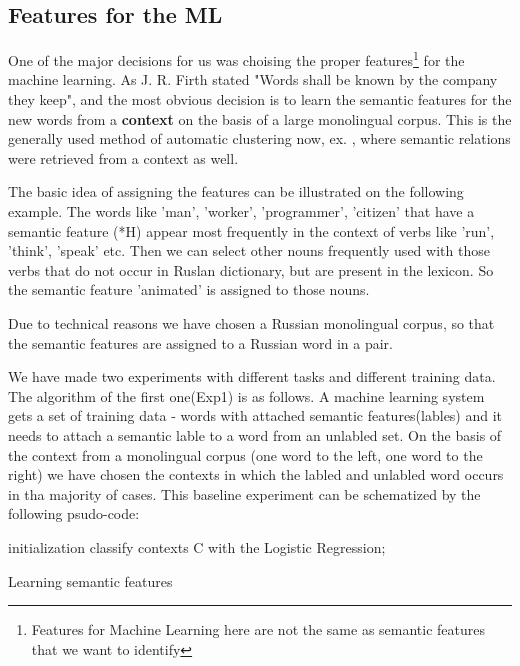 \documentclass[10pt,a5paper,twoside]{article}
\begin{document}
\subsection{Features for the ML}
One of the major decisions for us was choising the proper 
features\footnote{Features for Machine Learning here are not the same as 
semantic features that we want to identify}
for the machine learning.
As J. R. Firth stated "Words shall be known by the company they keep",
 and the most obvious decision is to learn the semantic features for the new words
from a \textbf{context} on the basis of a large monolingual corpus. This is 
the generally used method of automatic clustering now, ex. \cite{baroni:2009},
where semantic relations were retrieved from a context as well.

The basic idea of assigning the features can be illustrated
on the following example. The words like 'man', 'worker', 
'programmer', 'citizen' that have a semantic feature (*H) appear
most frequently in the context of verbs like 'run', 'think', 'speak' etc.
Then we can select other nouns frequently used with those verbs that
do not occur in Ruslan dictionary, but are present in the lexicon. So the 
semantic feature 'animated' is assigned to those nouns.

Due to technical reasons
we have chosen a Russian monolingual corpus, so that the semantic features
are assigned to a Russian word in a pair. 

We have made two experiments with different tasks and different training data.
The algorithm of the first one(Exp1) is as follows. 
A machine learning system gets a set of training data - 
words with attached semantic features(lables) and
it needs to attach a semantic lable to a word from an unlabled set.
On the basis of the context from a monolingual corpus 
(one word to the left, one word to the right) we have chosen the contexts in which 
the labled and unlabled word occurs in tha majority of cases.
This baseline experiment can be schematized by the following psudo-code:%
\begin{algorithm}[H]
 \SetAlgoLined
 initialization\;
 classify contexts C with the Logistic Regression;
 \caption{Learning semantic features}
\end{algorithm}
\end{document}
